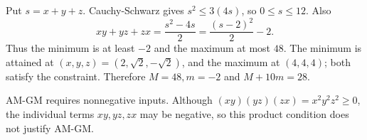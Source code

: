 Put $s=x+y+z$. Cauchy-Schwarz gives $s^2\le3(4s)$, so $0\le s\le12$. Also
\[
xy+yz+zx=\dfrac{s^2-4s}{2}=\dfrac{(s-2)^2}{2}-2.
\]
Thus the minimum is at least $-2$ and the maximum at most $48$. The minimum is attained at $(x,y,z)=(2,\sqrt2,-\sqrt2)$, and the maximum at $(4,4,4)$; both satisfy the constraint. Therefore $M=48,m=-2$ and $\boxed{M+10m=28}$.

AM-GM requires nonnegative inputs. Although $(xy)(yz)(zx)=x^2y^2z^2\ge0$, the individual terms $xy,yz,zx$ may be negative, so this product condition does not justify AM-GM.
